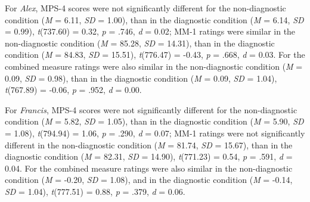 \documentclass[
  american,
  man,floatsintext]{apa7}
\begin{document}
For \emph{Alex}, MPS-4 scores were not significantly different for the non-diagnostic condition (\emph{M} = 6.11, \emph{SD} = 1.00), than in the diagnostic condition (\emph{M} = 6.14, \emph{SD} = 0.99), \emph{t}(737.60) = 0.32, \emph{p} = .746, \emph{d} = 0.02; MM-1 ratings were similar in the non-diagnostic condition (\emph{M} = 85.28, \emph{SD} = 14.31), than in the diagnostic condition (\emph{M} = 84.83, \emph{SD} = 15.51), \emph{t}(776.47) = -0.43, \emph{p} = .668, \emph{d} = 0.03. For the combined measure ratings were also similar in the non-diagnostic condition (\emph{M} = 0.09, \emph{SD} = 0.98), than in the diagnostic condition (\emph{M} = 0.09, \emph{SD} = 1.04), \emph{t}(767.89) = -0.06, \emph{p} = .952, \emph{d} = 0.00.

For \emph{Francis}, MPS-4 scores were not significantly different for the non-diagnostic condition (\emph{M} = 5.82, \emph{SD} = 1.05), than in the diagnostic condition (\emph{M} = 5.90, \emph{SD} = 1.08), \emph{t}(794.94) = 1.06, \emph{p} = .290, \emph{d} = 0.07; MM-1 ratings were not significantly different in the non-diagnostic condition (\emph{M} = 81.74, \emph{SD} = 15.67), than in the diagnostic condition (\emph{M} = 82.31, \emph{SD} = 14.90), \emph{t}(771.23) = 0.54, \emph{p} = .591, \emph{d} = 0.04. For the combined measure ratings were also similar in the non-diagnostic condition (\emph{M} = -0.20, \emph{SD} = 1.08), and in the diagnostic condition (\emph{M} = -0.14, \emph{SD} = 1.04), \emph{t}(777.51) = 0.88, \emph{p} = .379, \emph{d} = 0.06.


\clearpage
\renewcommand{\listfigurename}{Figure captions}

\clearpage
\renewcommand{\listtablename}{Table captions}
\end{document}
